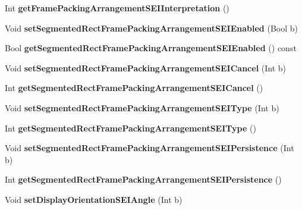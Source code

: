 \begin{DoxyCompactItemize}
\mbox{\label{class_t_enc_cfg_a9fb98d94155daa4cd10b5532b741e0ea}} 
Int {\bfseries get\+Frame\+Packing\+Arrangement\+S\+E\+I\+Interpretation} ()
\item 
\mbox{\label{class_t_enc_cfg_a5e67a70ce7dfb2d9df255c27081ffd16}} 
Void {\bfseries set\+Segmented\+Rect\+Frame\+Packing\+Arrangement\+S\+E\+I\+Enabled} (Bool b)
\item 
\mbox{\label{class_t_enc_cfg_a7b2f79153c84208ac40015921ce3d2e9}} 
Bool {\bfseries get\+Segmented\+Rect\+Frame\+Packing\+Arrangement\+S\+E\+I\+Enabled} () const
\item 
\mbox{\label{class_t_enc_cfg_ac2d7d3c4681e1fbe6db192294c11c2b1}} 
Void {\bfseries set\+Segmented\+Rect\+Frame\+Packing\+Arrangement\+S\+E\+I\+Cancel} (Int b)
\item 
\mbox{\label{class_t_enc_cfg_af7db35149ad8555ccaaa11a60e5417a7}} 
Int {\bfseries get\+Segmented\+Rect\+Frame\+Packing\+Arrangement\+S\+E\+I\+Cancel} ()
\item 
\mbox{\label{class_t_enc_cfg_afa8ca3a8a8705d72ebb3e71a2e92ec44}} 
Void {\bfseries set\+Segmented\+Rect\+Frame\+Packing\+Arrangement\+S\+E\+I\+Type} (Int b)
\item 
\mbox{\label{class_t_enc_cfg_a233866c030370d531cf5ad7a00a2220c}} 
Int {\bfseries get\+Segmented\+Rect\+Frame\+Packing\+Arrangement\+S\+E\+I\+Type} ()
\item 
\mbox{\label{class_t_enc_cfg_af796c7ada9d6dcdb8657ff9d259d8e0b}} 
Void {\bfseries set\+Segmented\+Rect\+Frame\+Packing\+Arrangement\+S\+E\+I\+Persistence} (Int b)
\item 
\mbox{\label{class_t_enc_cfg_a9111104ca8936d752471d9a7f198e867}} 
Int {\bfseries get\+Segmented\+Rect\+Frame\+Packing\+Arrangement\+S\+E\+I\+Persistence} ()
\item 
\mbox{\label{class_t_enc_cfg_a1d982d13aae9ea3c618c41c7c9bca2e2}} 
Void {\bfseries set\+Display\+Orientation\+S\+E\+I\+Angle} (Int b)
\item 

\end{DoxyCompactItemize}
